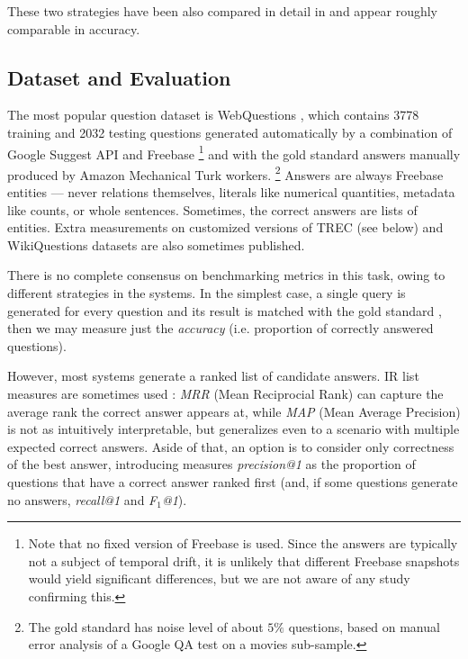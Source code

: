 These two strategies have been also compared in detail in \cite{FreebaseQA2014Yao}
and appear roughly comparable in accuracy.

\subsection{Dataset and Evaluation}

The most popular question dataset is WebQuestions \citep{WebQuestions},
which contains 3778 training and 2032 testing questions generated
automatically by a combination of Google Suggest API and Freebase%
\footnote{Note that no fixed version of Freebase is used.
	Since the answers are typically not a subject of temporal drift,
	it is unlikely that different Freebase snapshots would yield
	significant differences, but we are not aware of any study confirming this.}
and with the gold standard answers manually produced by Amazon Mechanical Turk workers.%
\footnote{The gold standard has noise level of about $5\%$ questions,
	based on manual error analysis of a Google QA test on a movies sub-sample.}
Answers are always Freebase entities --- never relations themselves,
literals like numerical quantities, metadata like counts, or whole sentences.
Sometimes, the correct answers are lists of entities.
Extra measurements on customized versions of TREC (see below) and WikiQuestions
datasets are also sometimes published.

There is no complete consensus on benchmarking metrics in this task,
owing to different strategies in the systems.
In the simplest case, a single query is generated for every question
and its result is matched with the gold standard
\citep{Semantic2013Berant}, then we may measure just the \textit{accuracy}
(i.e. proportion of correctly answered questions).

However, most systems generate a ranked list of candidate answers.
IR list measures are sometimes used \citep{Fader2013Paraphrase,Semantic2014Bordes}:
\textit{MRR} (Mean Reciprocial Rank) can capture the average rank the correct answer appears at,
while \textit{MAP} (Mean Average Precision) is not as intuitively interpretable, but generalizes
even to a scenario with multiple expected correct answers.
Aside of that, an option is to consider only correctness of the best answer,
introducing measures
\textit{precision@1} as the proportion of questions that have a correct answer ranked first
(and, if some questions generate no answers, \textit{recall@1} and \textit{F$_1$@1}).


